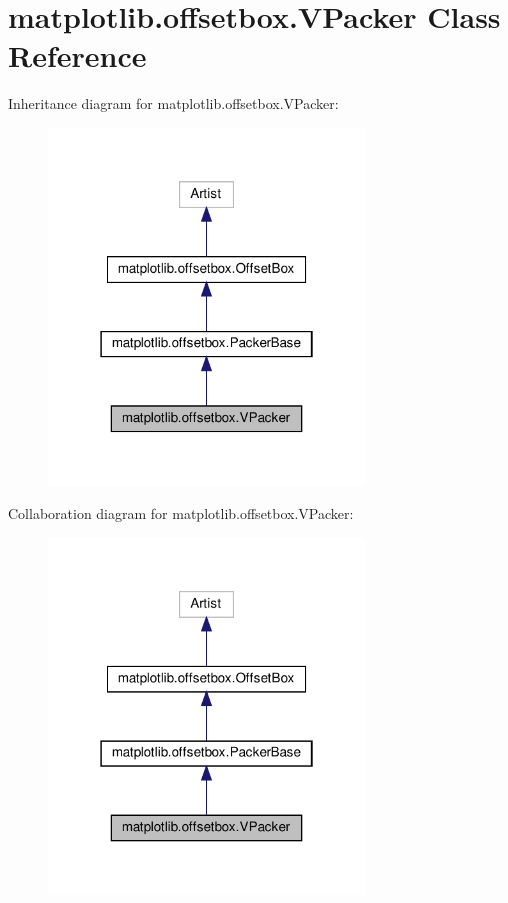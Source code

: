 \hypertarget{classmatplotlib_1_1offsetbox_1_1VPacker}{}\section{matplotlib.\+offsetbox.\+V\+Packer Class Reference}
\label{classmatplotlib_1_1offsetbox_1_1VPacker}


Inheritance diagram for matplotlib.\+offsetbox.\+V\+Packer\+:
\nopagebreak
\begin{figure}[H]
\begin{center}
\leavevmode
\includegraphics[width=238pt]{classmatplotlib_1_1offsetbox_1_1VPacker__inherit__graph}
\end{center}
\end{figure}


Collaboration diagram for matplotlib.\+offsetbox.\+V\+Packer\+:
\nopagebreak
\begin{figure}[H]
\begin{center}
\leavevmode
\includegraphics[width=238pt]{classmatplotlib_1_1offsetbox_1_1VPacker__coll__graph}
\end{center}
\end{figure}
